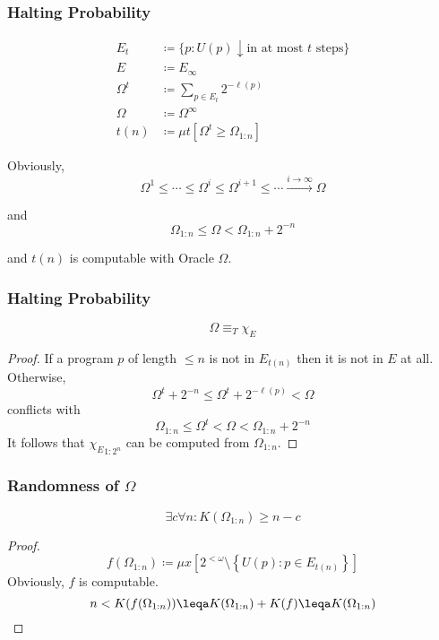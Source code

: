 \documentclass[UTF8,11pt,colorlinks,compress,openany]{beamer}%
\begin{document}
\begin{frame}\frametitle{Halting Probability}
\setlength\abovedisplayskip{0pt}
\setlength\belowdisplayskip{0pt}
	\begin{definition}
		\begin{align*}
		E_t &\coloneqq \big\{p: U(p)\downarrow \text{in at most $t$ steps}\big\}\\
		E &\coloneqq E_\infty\\
		\Omega^t &\coloneqq \sum\limits_{p\in E_t}2^{-\ell(p)}\\
		\Omega &\coloneqq \Omega^\infty\\
		t(n) &\coloneqq \mu t[\Omega^t\geq\Omega_{1:n}]
		\end{align*}
	\end{definition}
	Obviously,\[\Omega^1\leq\cdots\leq\Omega^i\leq\Omega^{i+1}\leq\cdots\xrightarrow{i\to\infty}\Omega\]
	
	and \[\Omega_{1:n}\leq\Omega<\Omega_{1:n}+2^{-n}\]
	
	and $t(n)$ is computable with Oracle $\Omega$.
\end{frame}

\begin{frame}\frametitle{Halting Probability}
\setlength\abovedisplayskip{0pt}
\setlength\belowdisplayskip{0pt}
	\begin{lemma}
		\[\Omega\equiv_T\chi_E\]
	\end{lemma}
	\begin{proof}
		If a program $p$ of length $\leq n$ is not in $E_{t(n)}$ then it is not in $E$ at all. Otherwise, \[\Omega^t+2^{-n}\leq\Omega^t+2^{-\ell(p)}<\Omega\] conflicts with \[\Omega_{1:n}\leq\Omega^t<\Omega<\Omega_{1:n}+2^{-n}\]
		It follows that ${\chi_E}_{1:2^n}$ can be computed from $\Omega_{1:n}$.
	\end{proof}
\end{frame}

\begin{frame}\frametitle{Randomness of $\Omega$}
	\begin{theorem}
		\[\exists c\forall n: K(\Omega_{1:n})\geq n-c\]
	\end{theorem}
	\begin{proof}
		\[f(\Omega_{1:n})\coloneqq \mu x\left[2^{<\omega}\setminus\left\{U(p): p\in E_{t(n)}\right\}\right]\]
		Obviously, $f$ is computable.
		\[n<K(f(\Omega_{1:n}))\leqa K(\Omega_{1:n})+K(f)\leqa K(\Omega_{1:n})\]
	\end{proof}
\end{frame}
\end{document}
